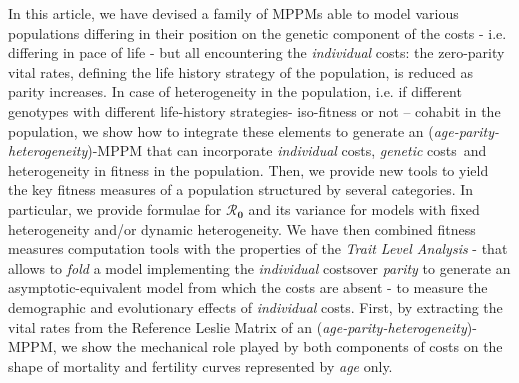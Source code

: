 \documentclass[10pt,a4paper]{article}
\newcommand{\lam}{$\lambda$}
\newcommand{\Rzero}{$\boldsymbol{\mathcal{R}_{0}}$  }
\newcommand{\PCoR}{\emph{individual} costs}
\newcommand{\GCoR}{\emph{genetic} costs}
\begin{document}
In this article, we have devised a family of MPPMs able to model various populations differing in their position on the genetic component of the costs - i.e. differing in pace of life - but all encountering the \PCoR: the zero-parity vital rates, defining the life history  strategy of the population, is reduced as parity increases. 
In case of heterogeneity in the population, i.e. if different genotypes with different life-history strategies- iso-fitness or not – cohabit in the population, we show how to integrate these elements to generate an (\emph{age-parity-heterogeneity})-MPPM  that can incorporate \PCoR, \GCoR\ and heterogeneity in fitness in the population. Then, we provide new tools to yield the key fitness measures of a population structured by several categories. In particular, we provide formulae for \Rzero and its variance for models with fixed heterogeneity and/or dynamic heterogeneity. 
We have then combined fitness measures computation tools with the properties of the \emph{Trait Level Analysis} - that allows to \emph{fold} a model implementing the \PCoR over \emph{parity} to generate an asymptotic-equivalent model from which the costs are absent - to measure the demographic and evolutionary effects of \PCoR. First, by extracting the vital rates from the Reference Leslie Matrix of an (\emph{age-parity-heterogeneity})-MPPM, we show the mechanical role played by both components of costs on the shape of mortality and fertility curves represented by \emph{age} only.
\end{document}
